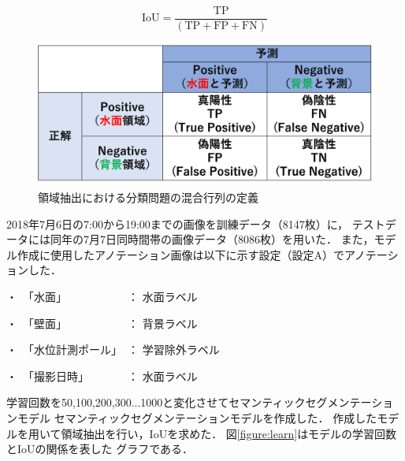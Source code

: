 \begin{equation}
  \label{IoU}
  \mbox{IoU} =  \frac{\mbox{TP}}{(\mbox{TP}+\mbox{FP}+\mbox{FN})}
\end{equation}
\vspace{5mm}
\begin{figure}[ht] 
  \begin{center}
    \includegraphics[width=150mm]{image/TP.png}
  \end{center}
  \caption{領域抽出における分類問題の混合行列の定義}
  \label{tp}
\end{figure}

\vspace{5mm}
2018年7月6日の7:00から19:00までの画像を訓練データ（8147枚）に，
テストデータには同年の7月7日同時間帯の画像データ（8086枚）を用いた．
また，モデル作成に使用したアノテーション画像は以下に示す設定（設定A）でアノテーションした．

\begin{description}
    \item・　「水面」　　　　　　： 水面ラベル
    \vspace{-2mm}
    \item・　「壁面」　　　　　　： 背景ラベル
    \vspace{-2mm}
    \item・　「水位計測ポール」　： 学習除外ラベル
    \vspace{-2mm}
    \item・　「撮影日時」　　　　： 水面ラベル
\end{description}
\clearpage

学習回数を50,100,200,300...1000と変化させてセマンティックセグメンテーションモデル
セマンティックセグメンテーションモデルを作成した．
作成したモデルを用いて領域抽出を行い，IoUを求めた．
図\ref{figure:learn}はモデルの学習回数とIoUの関係を表した
グラフである．

